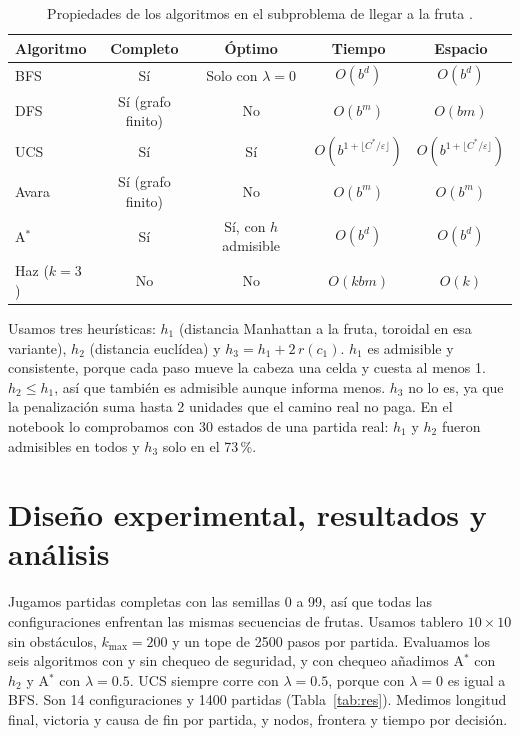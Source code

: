 \documentclass[11pt,letterpaper]{article}
\begin{document}
\begin{table}[h]
\centering\footnotesize\renewcommand{\arraystretch}{0.92}
\caption{Propiedades de los algoritmos en el subproblema de llegar a la fruta \cite{aima}.}
\label{tab:alg}
\begin{tabular}{lcccc}
\toprule
Algoritmo & Completo & Óptimo & Tiempo & Espacio\\
\midrule
BFS & Sí & Solo con $\lambda=0$ & $O(b^d)$ & $O(b^d)$\\
DFS & Sí (grafo finito) & No & $O(b^m)$ & $O(bm)$\\
UCS \cite{dijkstra} & Sí & Sí & $O(b^{1+\lfloor C^*/\varepsilon\rfloor})$ & $O(b^{1+\lfloor C^*/\varepsilon\rfloor})$\\
Avara & Sí (grafo finito) & No & $O(b^m)$ & $O(b^m)$\\
A$^*$ \cite{hart} & Sí & Sí, con $h$ admisible & $O(b^d)$ & $O(b^d)$\\
Haz ($k=3$) & No & No & $O(kbm)$ & $O(k)$\\
\bottomrule
\end{tabular}
\end{table}

Usamos tres heurísticas: $h_1$ (distancia Manhattan a la fruta, toroidal en esa variante), $h_2$ (distancia euclídea) y $h_3=h_1+2\,r(c_1)$. $h_1$ es admisible y consistente, porque cada paso mueve la cabeza una celda y cuesta al menos 1. $h_2\le h_1$, así que también es admisible aunque informa menos. $h_3$ no lo es, ya que la penalización suma hasta 2 unidades que el camino real no paga. En el notebook lo comprobamos con 30 estados de una partida real: $h_1$ y $h_2$ fueron admisibles en todos y $h_3$ solo en el 73\,\%.

\section{Diseño experimental, resultados y análisis}

Jugamos partidas completas con las semillas 0 a 99, así que todas las configuraciones enfrentan las mismas secuencias de frutas. Usamos tablero $10\times10$ sin obstáculos, $k_{\max}=200$ y un tope de 2500 pasos por partida. Evaluamos los seis algoritmos con y sin chequeo de seguridad, y con chequeo añadimos A$^*$ con $h_2$ y A$^*$ con $\lambda=0.5$. UCS siempre corre con $\lambda=0.5$, porque con $\lambda=0$ es igual a BFS. Son 14 configuraciones y 1400 partidas (Tabla~\ref{tab:res}). Medimos longitud final, victoria y causa de fin por partida, y nodos, frontera y tiempo por decisión.
\end{document}
